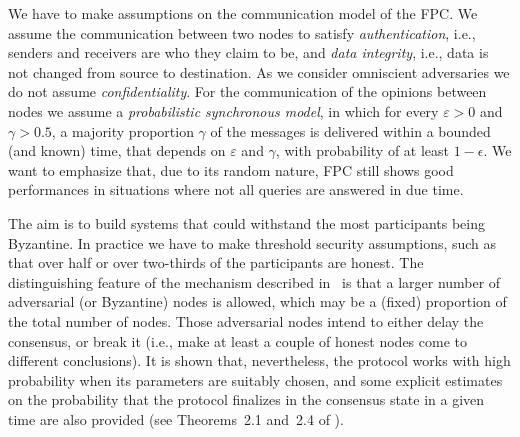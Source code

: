\documentclass[../main.tex]{subfiles}
\begin{document}
We have to make assumptions on the communication model of the FPC. We assume the communication between two nodes to satisfy \emph{authentication}, i.e., senders and receivers are who they claim to be, and \emph{data integrity}, i.e., data is not changed from source to destination. As we consider omniscient adversaries we do not assume \emph{confidentiality}. 
For the communication of the opinions between nodes we assume a  \emph{probabilistic synchronous model}, in which for every $\varepsilon>0$ and $\gamma>0.5$, a majority proportion $\gamma$ of the messages  is delivered within a bounded (and known) time, that depends on $\varepsilon$ and $\gamma$, with probability of at least $1-\epsilon$. We want to emphasize that, due to its random nature, FPC still shows good performances in situations where not all queries are answered in due time.






The aim is to build systems that could withstand the most  participants being Byzantine. In practice we have  to make threshold security assumptions, such as that over half or over two-thirds of the participants  are honest. 
The distinguishing feature of the mechanism described in~\cite{popov2019}
is that a larger number of
adversarial (or Byzantine)
 nodes is allowed, which may be a (fixed)
proportion of the total number of nodes.
Those adversarial nodes 
intend to either delay the consensus,
or break it (i.e., make at least a couple of honest nodes
come to different conclusions).
 It is shown that,
nevertheless, the protocol works with high probability
 when its parameters
 are suitably chosen, and  
some explicit estimates on the probability 
that the protocol finalizes in the consensus state
in a given time are also provided (see Theorems~2.1
and~2.4 of \cite{popov2019}).
\end{document}
